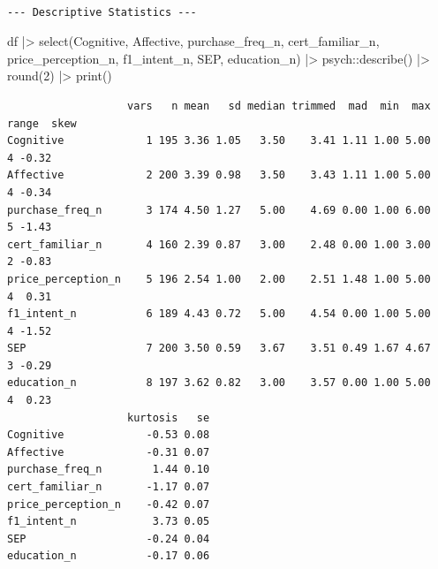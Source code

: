 \documentclass[
  letterpaper,
  DIV=11,
  numbers=noendperiod]{scrartcl}
\newenvironment{Shaded}{\begin{snugshade}}{\end{snugshade}}
\newcommand{\DecValTok}[1]{\textcolor[rgb]{0.68,0.00,0.00}{#1}}
\newcommand{\FunctionTok}[1]{\textcolor[rgb]{0.28,0.35,0.67}{#1}}
\newcommand{\NormalTok}[1]{\textcolor[rgb]{0.00,0.23,0.31}{#1}}
\newcommand{\SpecialCharTok}[1]{\textcolor[rgb]{0.37,0.37,0.37}{#1}}
\begin{document}
\begin{verbatim}

--- Descriptive Statistics ---
\end{verbatim}

\begin{Shaded}
\begin{Highlighting}[]
\NormalTok{df }\SpecialCharTok{|\textgreater{}} 
  \FunctionTok{select}\NormalTok{(Cognitive, Affective, purchase\_freq\_n, cert\_familiar\_n,}
\NormalTok{         price\_perception\_n, f1\_intent\_n, SEP, education\_n) }\SpecialCharTok{|\textgreater{}}
\NormalTok{  psych}\SpecialCharTok{::}\FunctionTok{describe}\NormalTok{() }\SpecialCharTok{|\textgreater{}}
  \FunctionTok{round}\NormalTok{(}\DecValTok{2}\NormalTok{) }\SpecialCharTok{|\textgreater{}}
  \FunctionTok{print}\NormalTok{()}
\end{Highlighting}
\end{Shaded}

\begin{verbatim}
                   vars   n mean   sd median trimmed  mad  min  max range  skew
Cognitive             1 195 3.36 1.05   3.50    3.41 1.11 1.00 5.00     4 -0.32
Affective             2 200 3.39 0.98   3.50    3.43 1.11 1.00 5.00     4 -0.34
purchase_freq_n       3 174 4.50 1.27   5.00    4.69 0.00 1.00 6.00     5 -1.43
cert_familiar_n       4 160 2.39 0.87   3.00    2.48 0.00 1.00 3.00     2 -0.83
price_perception_n    5 196 2.54 1.00   2.00    2.51 1.48 1.00 5.00     4  0.31
f1_intent_n           6 189 4.43 0.72   5.00    4.54 0.00 1.00 5.00     4 -1.52
SEP                   7 200 3.50 0.59   3.67    3.51 0.49 1.67 4.67     3 -0.29
education_n           8 197 3.62 0.82   3.00    3.57 0.00 1.00 5.00     4  0.23
                   kurtosis   se
Cognitive             -0.53 0.08
Affective             -0.31 0.07
purchase_freq_n        1.44 0.10
cert_familiar_n       -1.17 0.07
price_perception_n    -0.42 0.07
f1_intent_n            3.73 0.05
SEP                   -0.24 0.04
education_n           -0.17 0.06
\end{verbatim}
\end{document}
